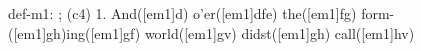 def-m1: \grealign;
(c4) 1. And([em1]d) o'er([em1]dfe) the([em1]fg) form-([em1]gh)ing([em1]gf) world([em1]gv) didst([em1]gh) call([em1]hv)